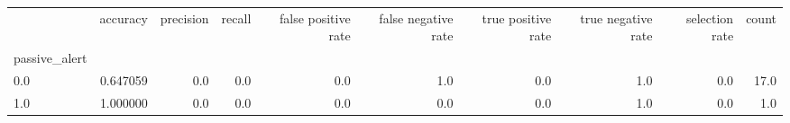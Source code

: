 \begin{tabular}{lrrrrrrrrr}
\toprule
{} &  accuracy &  precision &  recall &  false positive rate &  false negative rate &  true positive rate &  true negative rate &  selection rate &  count \\
passive\_alert &           &            &         &                      &                      &                     &                     &                 &        \\
\midrule
0.0           &  0.647059 &        0.0 &     0.0 &                  0.0 &                  1.0 &                 0.0 &                 1.0 &             0.0 &   17.0 \\
1.0           &  1.000000 &        0.0 &     0.0 &                  0.0 &                  0.0 &                 0.0 &                 1.0 &             0.0 &    1.0 \\
\bottomrule
\end{tabular}
